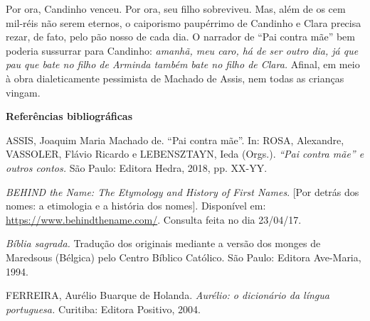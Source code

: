 Por ora, Candinho venceu. Por ora, seu filho sobreviveu. Mas, além de os
cem mil-réis não serem eternos, o caiporismo paupérrimo de Candinho e
Clara precisa rezar, de fato, pelo pão nosso de cada dia. O narrador de
``Pai contra mãe'' bem poderia sussurrar para Candinho: \emph{amanhã,
meu caro, há de ser outro dia, já que pau que bate no filho de Arminda
também bate no filho de Clara.} Afinal, em meio à obra dialeticamente
pessimista de Machado de Assis, nem todas as crianças vingam.

\textbf{Referências bibliográficas}

ASSIS, Joaquim Maria Machado de. ``Pai contra mãe''. In: ROSA,
Alexandre, VASSOLER, Flávio Ricardo e LEBENSZTAYN, Ieda (Orgs.).
\emph{``Pai contra mãe'' e outros contos.} São Paulo: Editora Hedra,
2018, pp. XX-YY.

\emph{BEHIND the Name: The Etymology and History of First Names}. {[}Por
detrás dos nomes: a etimologia e a história dos nomes{]}. Disponível em:
\href{https://www.behindthename.com/}{{https://www.behindthename.com/}}.
Consulta feita no dia 23/04/17.

\emph{Bíblia sagrada.} Tradução dos originais mediante a versão dos
monges de Maredsous (Bélgica) pelo Centro Bíblico Católico. São Paulo:
Editora Ave-Maria, 1994.

FERREIRA, Aurélio Buarque de Holanda. \emph{Aurélio: o dicionário da
língua portuguesa.} Curitiba: Editora Positivo, 2004.